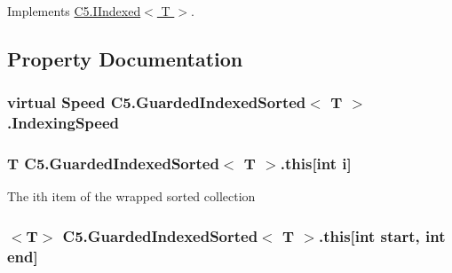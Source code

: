 Implements \hyperlink{interface_c5_1_1_i_indexed_aa9d2a1706ba0361079d31c02bad3e810}{C5.\+I\+Indexed$<$ T $>$}.



\subsection{Property Documentation}
\hypertarget{class_c5_1_1_guarded_indexed_sorted_a57f771060cc1af22826097d4f7fa002f}{}
\subsubsection[{Indexing\+Speed}]{\setlength{\rightskip}{0pt plus 5cm}virtual {\bf Speed} {\bf C5.\+Guarded\+Indexed\+Sorted}$<$ T $>$.Indexing\+Speed\hspace{0.3cm}{\ttfamily [get]}}\label{class_c5_1_1_guarded_indexed_sorted_a57f771060cc1af22826097d4f7fa002f}




\hypertarget{class_c5_1_1_guarded_indexed_sorted_a56e09512c3d2bfccb720141d7239cdc5}{}
\subsubsection[{this[int i]}]{\setlength{\rightskip}{0pt plus 5cm}T {\bf C5.\+Guarded\+Indexed\+Sorted}$<$ T $>$.this\mbox{[}int i\mbox{]}\hspace{0.3cm}{\ttfamily [get]}}\label{class_c5_1_1_guarded_indexed_sorted_a56e09512c3d2bfccb720141d7239cdc5}




The i\textquotesingle{}th item of the wrapped sorted collection\hypertarget{class_c5_1_1_guarded_indexed_sorted_a5c5994179a814f8eb2d75007fe5aa628}{}
\subsubsection[{this[int start, int end]}]{$<$T$>$ {\bf C5.\+Guarded\+Indexed\+Sorted}$<$ T $>$.this\mbox{[}int start, int end\mbox{]}\hspace{0.3cm}{\ttfamily [get]}}\label{class_c5_1_1_guarded_indexed_sorted_a5c5994179a814f8eb2d75007fe5aa628}




